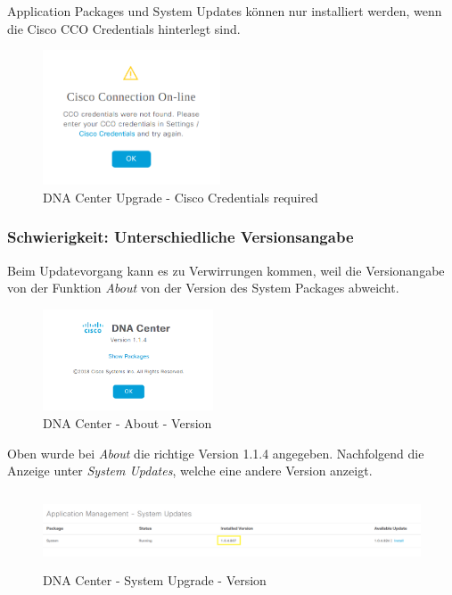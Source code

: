 Application Packages und System Updates können nur installiert werden, wenn die Cisco CCO Credentials hinterlegt sind.

\begin{figure}[H]
	\centering
	\includegraphics[height=4cm]{img/dan-center-cisco-credentials-required.png}
	\caption{DNA Center Upgrade - Cisco Credentials required}
	\label{fig:dna-center-cisco-credentials-required}
\end{figure}

\subsubsection{Schwierigkeit: Unterschiedliche Versionsangabe}

Beim Updatevorgang kann es zu Verwirrungen kommen, weil die Versionangabe von der Funktion \textit{About} von der Version des System Packages abweicht.

\begin{figure}[H]
	\centering
	\includegraphics[height=3cm]{img/dna-center-about.png}
	\caption{DNA Center - About - Version}
	\label{fig:dna-center-about}
\end{figure}

Oben wurde bei \textit{About} die richtige Version 1.1.4 angegeben. Nachfolgend die Anzeige unter \textit{System Updates}, welche eine andere Version anzeigt.
\begin{figure}[H]
	\centering
	\includegraphics[height=2.25cm]{img/dna-center-system-upgrade-version.png}
	\caption{DNA Center - System Upgrade - Version}
	\label{fig:dna-center-system-upgrade}
\end{figure}

